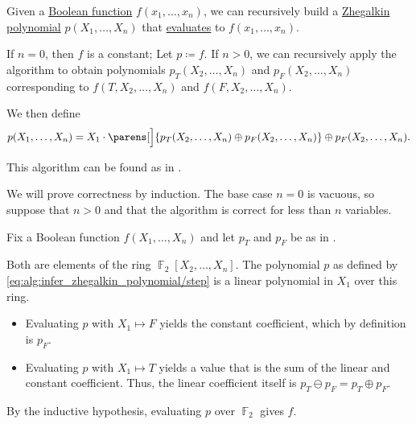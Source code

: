 \begin{algorithm}\label{alg:infer_zhegalkin_polynomial}
  Given a \hyperref[def:boolean_function]{Boolean function} \( f(x_1, \ldots, x_n) \), we can recursively build a \hyperref[def:zhegalkin_polynomial]{Zhegalkin polynomial} \( p(X_1, \ldots, X_n) \) that \hyperref[con:evaluation_homomorphism]{evaluates} to \( f(x_1, \ldots, x_n) \).

  \begin{thmenum}
     If \( n = 0 \), then \( f \) is a constant; Let \( p \coloneqq f \).
     If \( n > 0 \), we can recursively apply the algorithm to obtain polynomials \( p_T(X_2, \ldots, X_n) \) and \( p_F(X_2, \ldots, X_n) \) corresponding to \( f(T, X_2, \ldots, X_n) \) and \( f(F, X_2, \ldots, X_n) \).

    We then define
    \begin{equation}\label{eq:alg:infer_zhegalkin_polynomial/step}
      p(X_1, \ldots, X_n) = X_1 \cdot \parens[\Big]{ p_T(X_2, \ldots, X_n) \oplus p_F(X_2, \ldots, X_n) } \oplus p_F(X_2, \ldots, X_n).
    \end{equation}
  \end{thmenum}
\end{algorithm}
\begin{comments}
  \item This algorithm can be found as  in \cite{notebook:code}.
\end{comments}
\begin{defproof}
  We will prove correctness by induction. The base case \( n = 0 \) is vacuous, so suppose that \( n > 0 \) and that the algorithm is correct for less than \( n \) variables.

  Fix a Boolean function \( f(X_1, \ldots, X_n) \) and let \( p_T \) and \( p_F \) be as in .

  Both are elements of the ring \( \BbbF_2[X_2, \ldots, X_n] \). The polynomial \( p \) as defined by \eqref{eq:alg:infer_zhegalkin_polynomial/step} is a linear polynomial in \( X_1 \) over this ring.
  \begin{itemize}
    \item Evaluating \( p \) with \( X_1 \mapsto F \) yields the constant coefficient, which by definition is \( p_F \).
    \item Evaluating \( p \) with \( X_1 \mapsto T \) yields a value that is the sum of the linear and constant coefficient. Thus, the linear coefficient itself is \( p_T \ominus p_F = p_T \oplus p_F \).
  \end{itemize}

  By the inductive hypothesis, evaluating \( p \) over \( \BbbF_2 \) gives \( f \).
\end{defproof}

